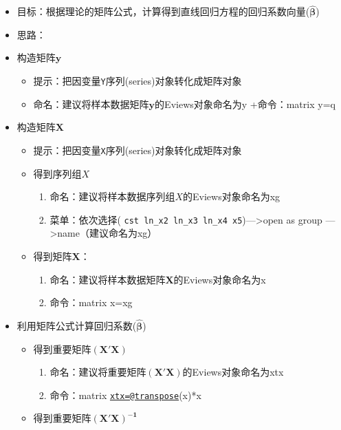 \documentclass[12pt,(landscape,a4paper),(portrait,a4paper)]{article}
\providecommand{\tightlist}{%
  \setlength{\itemsep}{0pt}\setlength{\parskip}{0pt}}
\begin{document}
\begin{itemize}
\item
  目标：根据理论的矩阵公式，计算得到直线回归方程的回归系数向量(\(\mathbf{\hat{\beta}}\))
\item
  思路：
\item
  构造矩阵\(\mathbf{y}\)

  \begin{itemize}
  \tightlist
  \item
    提示：把因变量\texttt{Y}序列(series)对象转化成矩阵对象
  \item
    命名：建议将样本数据矩阵\(\mathbf{y}\)的Eviews对象命名为y
    +命令：matrix y=q
  \end{itemize}
\item
  构造矩阵\(\mathbf{X}\)

  \begin{itemize}
  \tightlist
  \item
    提示：把因变量\texttt{X}序列(series)对象转化成矩阵对象
  \item
    得到序列组\(X\)

    \begin{enumerate}
    \def\labelenumi{\alph{enumi}.}
    \tightlist
    \item
      命名：建议将样本数据序列组\(X\)的Eviews对象命名为xg
    \item
      菜单：依次选择(
      \texttt{cst\ ln\_x2\ ln\_x3\ ln\_x4\ x5})---\textgreater{}open as
      group ---\textgreater{}name（建议命名为xg）
    \end{enumerate}
  \item
    得到矩阵\(\mathbf{X}\)：

    \begin{enumerate}
    \def\labelenumi{\alph{enumi}.}
    \tightlist
    \item
      命名：建议将样本数据矩阵\(\mathbf{X}\)的Eviews对象命名为x
    \item
      命令：matrix x=xg
    \end{enumerate}
  \end{itemize}
\item
  利用矩阵公式计算回归系数(\(\mathbf{\hat{\beta}}\))

  \begin{itemize}
  \tightlist
  \item
    得到重要矩阵\(\mathbf{(X'X)}\)

    \begin{enumerate}
    \def\labelenumi{\alph{enumi}.}
    \tightlist
    \item
      命名：建议将重要矩阵\(\mathbf{(X'X)}\)的Eviews对象命名为xtx
    \item
      命令：matrix
      \href{mailto:xtx=@transpose}{\nolinkurl{xtx=@transpose}}(x)*x
    \end{enumerate}
  \item
    得到重要矩阵\(\mathbf{{(X'X)}^{-1}}\)


\end{itemize}
\end{itemize}
\end{document}
